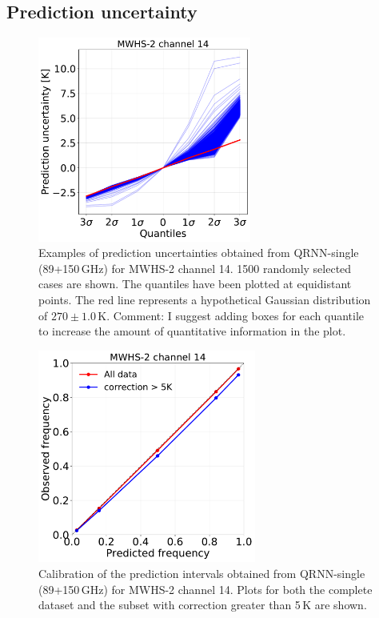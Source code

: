 \documentclass[amt, manuscript]{copernicus}
\newcommand{\todo}[1]{{\color{red} #1}}
\begin{document}
\subsection{Prediction uncertainty}
\label{sec:uncertainty_mwhs}
\begin{figure}[t]
	\includegraphics[width = 70mm]{Figures/prediction_uncertainty_MWHS_14.pdf}	
	\caption{Examples of prediction uncertainties obtained from QRNN-single (89+150\,GHz) for MWHS-2 channel 14. 1500 randomly selected cases are shown. The quantiles have been plotted at equidistant points. The red line represents a hypothetical Gaussian distribution of $270\pm1.0$\,K. \todo{Comment: I suggest adding boxes for each quantile to increase the amount of quantitative information in the plot.}}
	\label{fig:prediction_uncertainty_mwhs}	
\end{figure}
\begin{figure}[t]
	\includegraphics[height = 70mm]{Figures/calibration_QRNN_MWHS_14.pdf}	
	\caption{Calibration of the prediction intervals obtained from QRNN-single (89+150\,GHz) for MWHS-2 channel 14. Plots for both the complete dataset and the subset with correction greater than 5\,K are shown. }
	\label{fig:calibration_mwhs}	
\end{figure}
\end{document}
